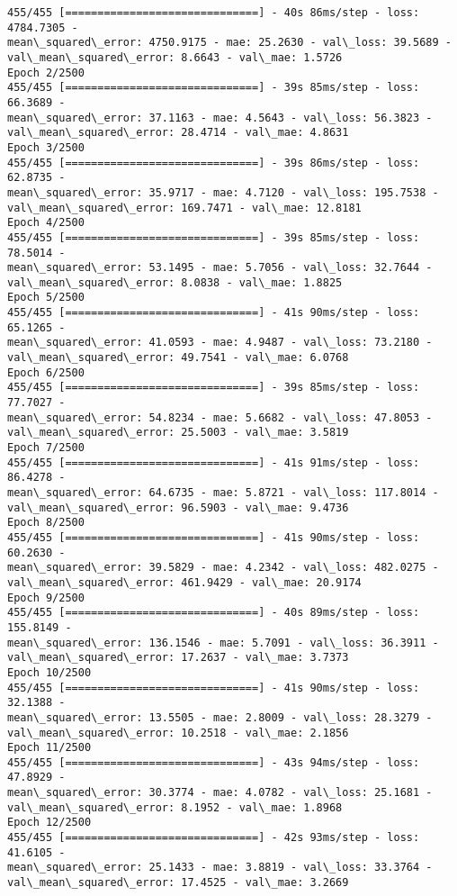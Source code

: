 \documentclass[11pt]{article}
\begin{document}
    \begin{Verbatim}[commandchars=\\\{\}]
455/455 [==============================] - 40s 86ms/step - loss: 4784.7305 -
mean\_squared\_error: 4750.9175 - mae: 25.2630 - val\_loss: 39.5689 -
val\_mean\_squared\_error: 8.6643 - val\_mae: 1.5726
Epoch 2/2500
455/455 [==============================] - 39s 85ms/step - loss: 66.3689 -
mean\_squared\_error: 37.1163 - mae: 4.5643 - val\_loss: 56.3823 -
val\_mean\_squared\_error: 28.4714 - val\_mae: 4.8631
Epoch 3/2500
455/455 [==============================] - 39s 86ms/step - loss: 62.8735 -
mean\_squared\_error: 35.9717 - mae: 4.7120 - val\_loss: 195.7538 -
val\_mean\_squared\_error: 169.7471 - val\_mae: 12.8181
Epoch 4/2500
455/455 [==============================] - 39s 85ms/step - loss: 78.5014 -
mean\_squared\_error: 53.1495 - mae: 5.7056 - val\_loss: 32.7644 -
val\_mean\_squared\_error: 8.0838 - val\_mae: 1.8825
Epoch 5/2500
455/455 [==============================] - 41s 90ms/step - loss: 65.1265 -
mean\_squared\_error: 41.0593 - mae: 4.9487 - val\_loss: 73.2180 -
val\_mean\_squared\_error: 49.7541 - val\_mae: 6.0768
Epoch 6/2500
455/455 [==============================] - 39s 85ms/step - loss: 77.7027 -
mean\_squared\_error: 54.8234 - mae: 5.6682 - val\_loss: 47.8053 -
val\_mean\_squared\_error: 25.5003 - val\_mae: 3.5819
Epoch 7/2500
455/455 [==============================] - 41s 91ms/step - loss: 86.4278 -
mean\_squared\_error: 64.6735 - mae: 5.8721 - val\_loss: 117.8014 -
val\_mean\_squared\_error: 96.5903 - val\_mae: 9.4736
Epoch 8/2500
455/455 [==============================] - 41s 90ms/step - loss: 60.2630 -
mean\_squared\_error: 39.5829 - mae: 4.2342 - val\_loss: 482.0275 -
val\_mean\_squared\_error: 461.9429 - val\_mae: 20.9174
Epoch 9/2500
455/455 [==============================] - 40s 89ms/step - loss: 155.8149 -
mean\_squared\_error: 136.1546 - mae: 5.7091 - val\_loss: 36.3911 -
val\_mean\_squared\_error: 17.2637 - val\_mae: 3.7373
Epoch 10/2500
455/455 [==============================] - 41s 90ms/step - loss: 32.1388 -
mean\_squared\_error: 13.5505 - mae: 2.8009 - val\_loss: 28.3279 -
val\_mean\_squared\_error: 10.2518 - val\_mae: 2.1856
Epoch 11/2500
455/455 [==============================] - 43s 94ms/step - loss: 47.8929 -
mean\_squared\_error: 30.3774 - mae: 4.0782 - val\_loss: 25.1681 -
val\_mean\_squared\_error: 8.1952 - val\_mae: 1.8968
Epoch 12/2500
455/455 [==============================] - 42s 93ms/step - loss: 41.6105 -
mean\_squared\_error: 25.1433 - mae: 3.8819 - val\_loss: 33.3764 -
val\_mean\_squared\_error: 17.4525 - val\_mae: 3.2669

\end{Verbatim}
\end{document}
